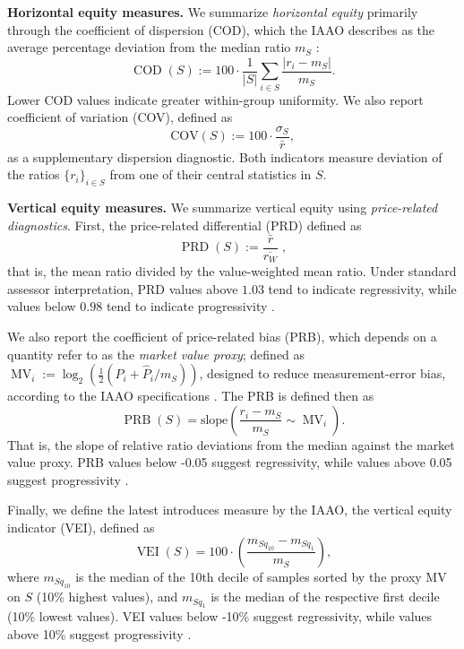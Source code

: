 \documentclass[12pt, draft]{article}
\theoremstyle{plain}
\theoremstyle{definition}
\newcommand{\1}{\mathbf{1}}
\begin{document}
{\medskip

\noindent \textbf{Horizontal equity measures.} We summarize \textit{horizontal equity} primarily through the coefficient of dispersion (COD), which the IAAO describes as the average percentage deviation from the median ratio $m_S$ \cite{IAAO2013Ratio,IAAO2025ExposureRatio}:
\begin{equation}
\label{eq:cod}
\operatorname{COD}(S)
:=
100\cdot\frac{1}{|S|}
\sum_{i\in S} \frac{|r_i-m_S|}{m_S}.
\end{equation}
Lower COD values indicate greater within-group uniformity.  We also report coefficient of variation (COV), defined as
\begin{equation}
\mathrm{COV}(S):=100 \cdot \frac{\sigma_S}{\bar r},
\end{equation}
as a supplementary dispersion diagnostic. Both indicators measure deviation of the ratios $\{r_i\}_{i \in S}$ from one of their central statistics in $S$.

\medskip

\noindent \textbf{Vertical equity measures.} We summarize vertical equity using \textit{price-related diagnostics}. First, the price-related differential (PRD) defined as
\begin{equation}
\label{eq:prd}
\operatorname{PRD}(S)
:=
\frac{\bar r}{\overline{r_W}}\;,
\end{equation}
that is, the mean ratio divided by the value-weighted mean ratio. Under standard assessor interpretation, PRD values above $1.03$ tend to indicate regressivity, while values below $0.98$ tend to indicate progressivity \cite{IAAO2013Ratio,IAAO2025ExposureRatio}.

We also report the coefficient of price-related bias (PRB), which depends on a quantity refer to as the \textit{market value proxy}; defined as $\operatorname{MV}_i := \log_2\left(\frac{1}{2} (P_i + \widehat{P}_i / m_S)\right)$, designed to reduce measurement-error bias, according to the IAAO specifications \cite{IAAO2025ExposureRatio}. The PRB is defined then as
\begin{equation}
\operatorname{PRB}(S)=\text{slope}\left(\frac{r_i- m_S}{m_S}\sim
  \operatorname{MV}_i\right).
\end{equation}
That is, the slope of relative ratio deviations from the median against the market value proxy. PRB values below -0.05 suggest {regressivity}, while values above 0.05 suggest {progressivity} \cite{IAAO2013Ratio,IAAO2025ExposureRatio}.

Finally, we define the latest introduces measure by the IAAO, the vertical equity indicator (VEI), defined as
\begin{equation}
\operatorname{VEI}(S)=100\cdot \left(\frac{m_{S{q_\text{10}}} - m_{S{q_\text{1}}}}{m_S}\right),
\end{equation}
where $m_{S{q_\text{10}}}$ is the median of the 10th decile of samples sorted by the proxy MV on $S$ (10\% highest values), and $m_{S{q_\text{1}}}$ is the median of the respective first decile (10\% lowest values). VEI values below -10\% suggest regressivity, while values above 10\% suggest progressivity \cite{IAAO2025ExposureRatio}.

}
\end{document}
